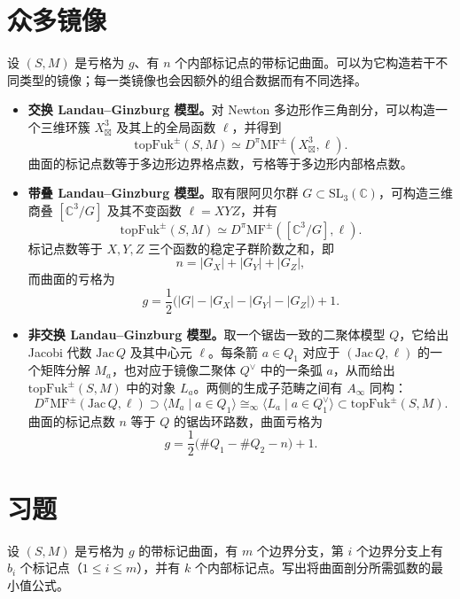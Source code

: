 \section{众多镜像}\label{sec:mirrors-galore}
设 $(S,M)$ 是亏格为 $g$、有 $n$ 个内部标记点的带标记曲面。可以为它构造若干不同类型的镜像；每一类镜像也会因额外的组合数据而有不同选择。

\begin{itemize}
  \item \textbf{交换 Landau--Ginzburg 模型。}对 Newton 多边形作三角剖分，可以构造一个三维环簇 $X_{\boxtimes}^{3}$ 及其上的全局函数 $\ell$，并得到
  \[
    \mathrm{topFuk}^{\pm}(S,M)\simeq D^{\pi}\mathrm{MF}^{\pm}(X_{\boxtimes}^{3},\ell).
  \]
  曲面的标记点数等于多边形边界格点数，亏格等于多边形内部格点数。

  \item \textbf{带叠 Landau--Ginzburg 模型。}取有限阿贝尔群 $G\subset\mathrm{SL}_3(\mathbb C)$，可构造三维商叠 $[\mathbb C^3/G]$ 及其不变函数 $\ell=XYZ$，并有
  \[
    \mathrm{topFuk}^{\pm}(S,M)\simeq D^{\pi}\mathrm{MF}^{\pm}([\mathbb C^3/G],\ell).
  \]
  标记点数等于 $X,Y,Z$ 三个函数的稳定子群阶数之和，即
  \[
    n=|G_X|+|G_Y|+|G_Z|,
  \]
  而曲面的亏格为
  \[
    g=\frac12\bigl(|G|-|G_X|-|G_Y|-|G_Z|\bigr)+1.
  \]

  \item \textbf{非交换 Landau--Ginzburg 模型。}取一个锯齿一致的二聚体模型 $Q$，它给出 Jacobi 代数 $\mathrm{Jac}\,Q$ 及其中心元 $\ell$。每条箭 $a\in Q_1$ 对应于 $(\mathrm{Jac}\,Q,\ell)$ 的一个矩阵分解 $M_a$，也对应于镜像二聚体 $Q^{\vee}$ 中的一条弧 $a$，从而给出 $\mathrm{topFuk}^{\pm}(S,M)$ 中的对象 $L_a$。两侧的生成子范畴之间有 $A_{\infty}$ 同构：
  \[
    D^{\pi}\mathrm{MF}^{\pm}(\mathrm{Jac}\,Q,\ell)\supset
    \langle M_a\mid a\in Q_1\rangle
    \cong_\infty
    \langle L_a\mid a\in Q^{\vee}_1\rangle
    \subset\mathrm{topFuk}^{\pm}(S,M).
  \]
  曲面的标记点数 $n$ 等于 $Q$ 的锯齿环路数，曲面亏格为
  \[
    g=\frac12\bigl(\#Q_1-\#Q_2-n\bigr)+1.
  \]
\end{itemize}

\section{习题}\label{sec:gluing-exercises}

\begin{exercise}\label{exer:gluing-min-arcs}
设 $(S,M)$ 是亏格为 $g$ 的带标记曲面，有 $m$ 个边界分支，第 $i$ 个边界分支上有 $b_i$ 个标记点（$1\le i\le m$），并有 $k$ 个内部标记点。写出将曲面剖分所需弧数的最小值公式。
\end{exercise}

